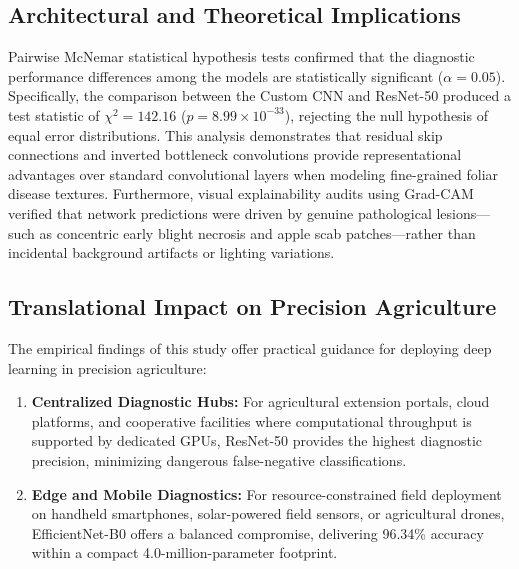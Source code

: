 \documentclass[journal]{IEEEtran}
\begin{document}
\subsection{Architectural and Theoretical Implications}
Pairwise McNemar statistical hypothesis tests confirmed that the diagnostic performance differences among the models are statistically significant ($\alpha = 0.05$). Specifically, the comparison between the Custom CNN and ResNet-50 produced a test statistic of $\chi^2 = 142.16$ ($p = 8.99 \times 10^{-33}$), rejecting the null hypothesis of equal error distributions. This analysis demonstrates that residual skip connections and inverted bottleneck convolutions provide representational advantages over standard convolutional layers when modeling fine-grained foliar disease textures. Furthermore, visual explainability audits using Grad-CAM verified that network predictions were driven by genuine pathological lesions—such as concentric early blight necrosis and apple scab patches—rather than incidental background artifacts or lighting variations.

\subsection{Translational Impact on Precision Agriculture}
The empirical findings of this study offer practical guidance for deploying deep learning in precision agriculture:
\begin{enumerate}
    \item \textbf{Centralized Diagnostic Hubs:} For agricultural extension portals, cloud platforms, and cooperative facilities where computational throughput is supported by dedicated GPUs, ResNet-50 provides the highest diagnostic precision, minimizing dangerous false-negative classifications.
    \item \textbf{Edge and Mobile Diagnostics:} For resource-constrained field deployment on handheld smartphones, solar-powered field sensors, or agricultural drones, EfficientNet-B0 offers a balanced compromise, delivering 96.34\% accuracy within a compact 4.0-million-parameter footprint.
\end{enumerate}
\end{document}
